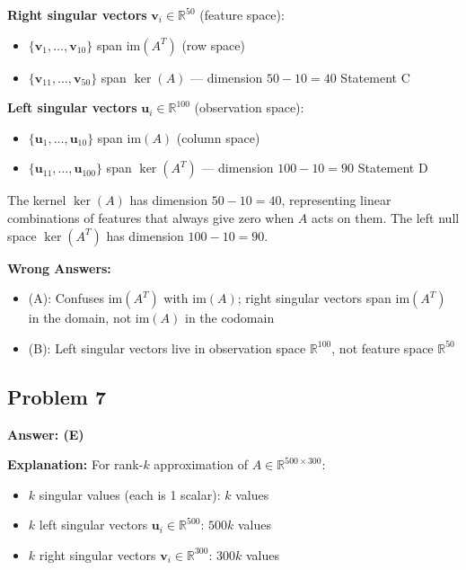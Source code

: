 \documentclass[12pt]{amsart}
\newcommand{\correct}[1]{{\color{correctgreen}\textbf{#1}}}
\begin{document}
\begin{itemize}
\textbf{Right singular vectors} $\mathbf{v}_i \in \mathbb{R}^{50}$ (feature space):
\begin{itemize}
\item $\{\mathbf{v}_1, \ldots, \mathbf{v}_{10}\}$ span $\text{im}(A^T)$ (row space)
\item $\{\mathbf{v}_{11}, \ldots, \mathbf{v}_{50}\}$ span $\ker(A)$ --- dimension $50 - 10 = 40$ \checkmark Statement C
\end{itemize}

\textbf{Left singular vectors} $\mathbf{u}_i \in \mathbb{R}^{100}$ (observation space):
\begin{itemize}
\item $\{\mathbf{u}_1, \ldots, \mathbf{u}_{10}\}$ span $\text{im}(A)$ (column space)
\item $\{\mathbf{u}_{11}, \ldots, \mathbf{u}_{100}\}$ span $\ker(A^T)$ --- dimension $100 - 10 = 90$ \checkmark Statement D
\end{itemize}

The kernel $\ker(A)$ has dimension $50 - 10 = 40$, representing linear combinations of features that always give zero when $A$ acts on them. The left null space $\ker(A^T)$ has dimension $100 - 10 = 90$.

\textbf{Wrong Answers:}
\begin{itemize}
\item (A): Confuses $\text{im}(A^T)$ with $\text{im}(A)$; right singular vectors span $\text{im}(A^T)$ in the domain, not $\text{im}(A)$ in the codomain
\item (B): Left singular vectors live in observation space $\mathbb{R}^{100}$, not feature space $\mathbb{R}^{50}$
\end{itemize}

\subsection*{Problem 7}
\correct{Answer: (E)}

\textbf{Explanation:} For rank-$k$ approximation of $A \in \mathbb{R}^{500 \times 300}$:
\begin{itemize}
\item $k$ singular values (each is 1 scalar): $k$ values
\item $k$ left singular vectors $\mathbf{u}_i \in \mathbb{R}^{500}$: $500k$ values
\item $k$ right singular vectors $\mathbf{v}_i \in \mathbb{R}^{300}$: $300k$ values
\end{itemize}


\end{itemize}
\end{document}
